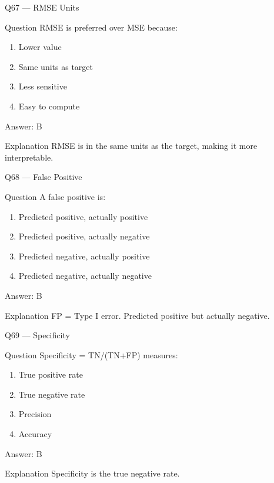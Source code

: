 \documentclass[aspectratio=169,8pt]{beamer}
\begin{document}
	\begin{frame}{Q67 --- RMSE Units}
		\begin{block}{Question}
			RMSE is preferred over MSE because:
		\end{block}
		\begin{enumerate}
			\item Lower value
			\item Same units as target
			\item Less sensitive
			\item Easy to compute
		\end{enumerate}
		\begin{exampleblock}{Answer: B}\end{exampleblock}
		\begin{block}{Explanation}
			RMSE is in the same units as the target, making it more interpretable.
		\end{block}
	\end{frame}
	
	\begin{frame}{Q68 --- False Positive}
		\begin{block}{Question}
			A false positive is:
		\end{block}
		\begin{enumerate}
			\item Predicted positive, actually positive
			\item Predicted positive, actually negative
			\item Predicted negative, actually positive
			\item Predicted negative, actually negative
		\end{enumerate}
		\begin{exampleblock}{Answer: B}\end{exampleblock}
		\begin{block}{Explanation}
			FP = Type I error. Predicted positive but actually negative.
		\end{block}
	\end{frame}
	
	\begin{frame}{Q69 --- Specificity}
		\begin{block}{Question}
			Specificity = TN/(TN+FP) measures:
		\end{block}
		\begin{enumerate}
			\item True positive rate
			\item True negative rate
			\item Precision
			\item Accuracy
		\end{enumerate}
		\begin{exampleblock}{Answer: B}\end{exampleblock}
		\begin{block}{Explanation}
			Specificity is the true negative rate.
		\end{block}
	\end{frame}
	
\end{document}
